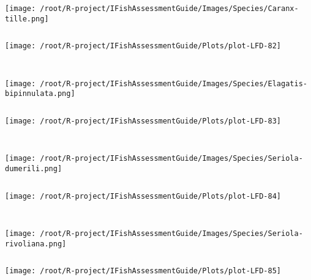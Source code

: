 \begin{knitrout}
\begin{kframe}
\begin{verbatim}
\end{verbatim}
\end{kframe}
\texttt{[image: /root/R-project/IFishAssessmentGuide/Images/Species/Caranx-tille.png]}
\begin{kframe}\begin{verbatim}
\end{verbatim}
\end{kframe}
\texttt{[image: /root/R-project/IFishAssessmentGuide/Plots/plot-LFD-82]} 
\begin{kframe}\begin{verbatim}
 
\end{verbatim}
\end{kframe}
\texttt{[image: /root/R-project/IFishAssessmentGuide/Images/Species/Elagatis-bipinnulata.png]}
\begin{kframe}\begin{verbatim}
\end{verbatim}
\end{kframe}
\texttt{[image: /root/R-project/IFishAssessmentGuide/Plots/plot-LFD-83]} 
\begin{kframe}\begin{verbatim}
 
\end{verbatim}
\end{kframe}
\texttt{[image: /root/R-project/IFishAssessmentGuide/Images/Species/Seriola-dumerili.png]}
\begin{kframe}\begin{verbatim}
\end{verbatim}
\end{kframe}
\texttt{[image: /root/R-project/IFishAssessmentGuide/Plots/plot-LFD-84]} 
\begin{kframe}\begin{verbatim}
 
\end{verbatim}
\end{kframe}
\texttt{[image: /root/R-project/IFishAssessmentGuide/Images/Species/Seriola-rivoliana.png]}
\begin{kframe}\begin{verbatim}
\end{verbatim}
\end{kframe}
\texttt{[image: /root/R-project/IFishAssessmentGuide/Plots/plot-LFD-85]} 
\begin{kframe}\begin{verbatim}
 

\end{verbatim}
\end{kframe}
\end{knitrout}
